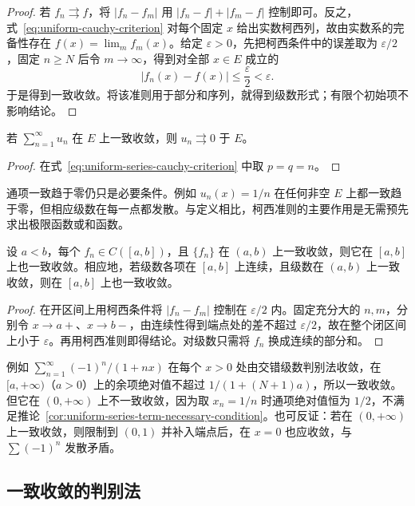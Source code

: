 \documentclass[UTF8,12pt,a4paper,fontset=fandol]{ctexbook}
\begin{document}
\begin{proof}
若 $f_n\rightrightarrows f$，将 $|f_n-f_m|$ 用 $|f_n-f|+|f_m-f|$ 控制即可。反之，式~\eqref{eq:uniform-cauchy-criterion} 对每个固定 $x$ 给出实数柯西列，故由实数系的完备性存在 $f(x)=\lim_m f_m(x)$。给定 $\varepsilon>0$，先把柯西条件中的误差取为 $\varepsilon/2$，固定 $n\geq N$ 后令 $m\to\infty$，得到对全部 $x\in E$ 成立的
\[
    |f_n(x)-f(x)|\leq\frac\varepsilon2<\varepsilon.
\]
于是得到一致收敛。将该准则用于部分和序列，就得到级数形式；有限个初始项不影响结论。
\end{proof}

\begin{corollary}
\label{cor:uniform-series-term-necessary-condition}
若 $\sum_{n=1}^\infty u_n$ 在 $E$ 上一致收敛，则 $u_n\rightrightarrows0$ 于 $E$。
\end{corollary}

\begin{proof}
在式~\eqref{eq:uniform-series-cauchy-criterion} 中取 $p=q=n$。
\end{proof}

通项一致趋于零仍只是必要条件。例如 $u_n(x)=1/n$ 在任何非空 $E$ 上都一致趋于零，但相应级数在每一点都发散。与定义相比，柯西准则的主要作用是无需预先求出极限函数或和函数。

\begin{proposition}[补入端点]
\label{prop:uniform-convergence-extension-to-endpoints}
设 $a<b$，每个 $f_n\in C([a,b])$，且 $\{f_n\}$ 在 $(a,b)$ 上一致收敛，则它在 $[a,b]$ 上也一致收敛。相应地，若级数各项在 $[a,b]$ 上连续，且级数在 $(a,b)$ 上一致收敛，则在 $[a,b]$ 上也一致收敛。
\end{proposition}

\begin{proof}
在开区间上用柯西条件将 $|f_n-f_m|$ 控制在 $\varepsilon/2$ 内。固定充分大的 $n,m$，分别令 $x\to a+$、$x\to b-$，由连续性得到端点处的差不超过 $\varepsilon/2$，故在整个闭区间上小于 $\varepsilon$。再用柯西准则即得结论。对级数只需将 $f_n$ 换成连续的部分和。
\end{proof}

例如 $\sum_{n=1}^\infty(-1)^n/(1+nx)$ 在每个 $x>0$ 处由交错级数判别法收敛，在 $[a,+\infty)$（$a>0$）上的余项绝对值不超过 $1/(1+(N+1)a)$，所以一致收敛。但它在 $(0,+\infty)$ 上不一致收敛，因为取 $x_n=1/n$ 时通项绝对值恒为 $1/2$，不满足推论~\ref{cor:uniform-series-term-necessary-condition}。也可反证：若在 $(0,+\infty)$ 上一致收敛，则限制到 $(0,1)$ 并补入端点后，在 $x=0$ 也应收敛，与 $\sum(-1)^n$ 发散矛盾。

\subsection{一致收敛的判别法}
\label{subsec:uniform-convergence-tests}
\end{document}

